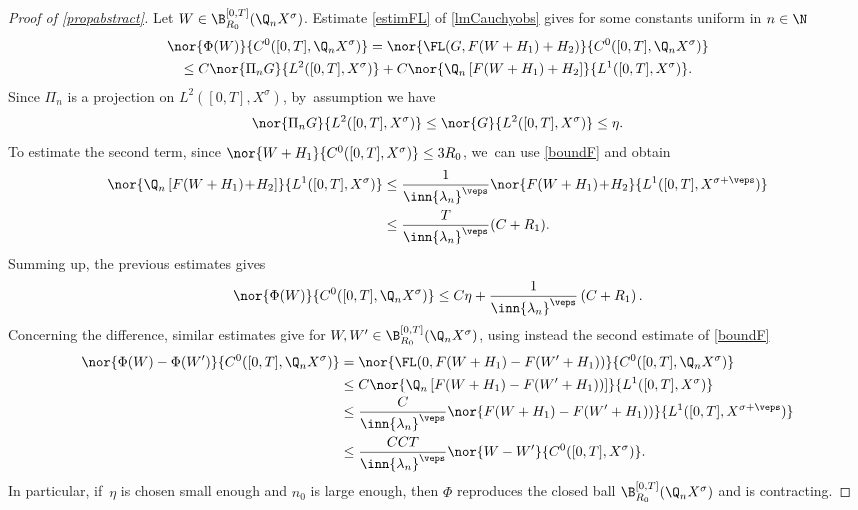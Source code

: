 \begin{proof}[Proof of \cref{propabstract}]
Let $W\in \B_{R_{0}}^{[0,T]}(\Q_n X^{\sigma})$. Estimate \eqref{estimFL} of \cref{lmCauchyobs} gives for some constants uniform in $n\in \N$\vspace*{-5pt}
\begin{multline*}
\nor{\Phi(W)}{C^{0}([0,T],\Q_{n}X^{\sigma})}=\nor{\FL(G,F(W+H_{1})+H_{2})}{C^{0}([0,T],\Q_{n}X^{\sigma})}\\
\leq C \nor{\Pi_{n}G}{L^{2}([0,T],X^{\sigma})}+C\nor{\Q_{n}\left[ F(W+H_{1})+H_{2}\right]}{L^{1}([0,T],X^{\sigma})}.
\end{multline*}
Since $\Pi_{n}$ is a projection on $L^2([0,T],X^{\sigma})$, by~assumption we have\vspace*{-3pt}
\[
\nor{\Pi_{n}G}{L^{2}([0,T],X^{\sigma})}\leq \nor{G}{L^{2}([0,T],X^{\sigma})}\leq \eta.
\]
To estimate the second term, since $\nor{W+H_{1}}{C^{0}([0,T],X^{\sigma})}\leq 3R_{0}$, we~can use \eqref{boundF} and obtain\vspace*{-3pt}
\begin{equation}\label{estimFinPhi}
\begin{aligned}
\nor{\Q_{n}\left[ F(W+H_{1})\!+\!H_{2}\right]}{L^{1}([0,T],X^{\sigma})}&\leq \frac{1}{\inn{\lambda_n}^{\veps}} \nor{F(W+H_{1})\!+\!H_{2}}{L^{1}([0,T],X^{\sigma+\veps})}\\
&\leq \frac{T}{\inn{\lambda_n}^{\veps}}(C+R_{1}).
\end{aligned}
\end{equation}
Summing up, the previous estimates gives
\begin{align*}
\nor{\Phi(W)}{C^{0}([0,T],\Q_{n}X^{\sigma})}\leq C\eta+ \frac{1}{\inn{\lambda_n}^{\veps}} \left(C+R_{1}\right).
\end{align*}
Concerning the difference, similar estimates give for $W, W'\in \B_{R_{0}}^{[0,T]}(\Q_n X^{\sigma})$, using instead the second estimate of \eqref{boundF}
\begin{align}
\nonumber\nor{\Phi(W)-\Phi(W')}{C^{0}([0,T],\Q_{n}X^{\sigma})}&=\nor{\FL(0,F(W+H_{1})-F(W'+H_{1}))}{C^{0}([0,T],\Q_{n}X^{\sigma})}\\
\nonumber&\leq C\nor{\Q_{n}\left[ F(W+H_{1})-F(W'+H_{1}))\right]}{L^{1}([0,T],X^{\sigma})}\\[-7pt]
\label{bounddiffW}\\[-10pt]
\nonumber&\leq \frac{C}{\inn{\lambda_n}^{\veps}} \nor{F(W+H_{1})-F(W'+H_{1}))}{L^{1}([0,T],X^{\sigma+\veps})}\\
\nonumber&\leq \frac{CCT}{\inn{\lambda_n}^{\veps}} \nor{W-W'}{C^{0}([0,T],X^{\sigma})}.
\end{align}
In particular, if~$\eta$ is chosen small enough and $n_{0}$ is large enough, then $\Phi$ reproduces the closed ball $\B_{R_{0}}^{[0,T]}(\Q_n X^{\sigma})$ and is contracting.


\end{proof}
